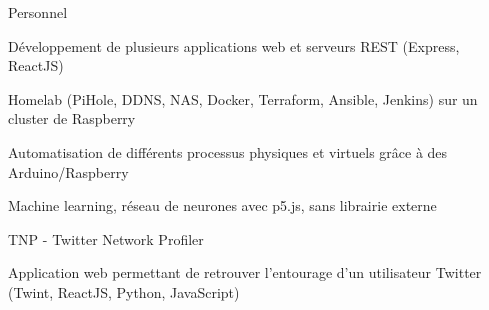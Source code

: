 
\begin{cventries}
  \cventry
    {} %
    {Personnel} %
    {} %
    {} %
    {
      \begin{cvitems} %
        \item {Développement de plusieurs applications web et serveurs REST (Express, ReactJS)}
        \item {Homelab (PiHole, DDNS, NAS, Docker, Terraform, Ansible, Jenkins) sur un cluster de Raspberry}
		    \item {Automatisation de différents processus physiques et virtuels grâce à des Arduino/Raspberry}
        \item {Machine learning, réseau de neurones avec p5.js, sans librairie externe}
      \end{cvitems}
    }

  \cventry
    {} %
    {TNP - Twitter Network Profiler} %
    {} %
    {} %
    {
      \begin{cvitems} %
      	\item {Application web permettant de retrouver l'entourage d'un utilisateur Twitter (Twint, ReactJS, Python, JavaScript)}
      \end{cvitems}
    }
\end{cventries}